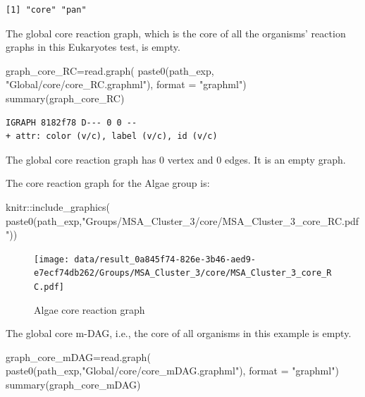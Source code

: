 \documentclass[
  letterpaper,
  DIV=11,
  numbers=noendperiod]{scrreprt}
\newenvironment{Shaded}{}{}
\newcommand{\AttributeTok}[1]{\textcolor[rgb]{0.78,0.47,0.87}{#1}}
\newcommand{\FunctionTok}[1]{\textcolor[rgb]{0.38,0.69,0.94}{#1}}
\newcommand{\NormalTok}[1]{\textcolor[rgb]{0.67,0.70,0.75}{#1}}
\newcommand{\OtherTok}[1]{\textcolor[rgb]{0.15,0.68,0.38}{#1}}
\newcommand{\SpecialCharTok}[1]{\textcolor[rgb]{0.34,0.71,0.76}{#1}}
\newcommand{\StringTok}[1]{\textcolor[rgb]{0.60,0.76,0.47}{#1}}
\begin{document}
\begin{verbatim}
[1] "core" "pan" 
\end{verbatim}

The global core reaction graph, which is the core of all the organisms'
reaction graphs in this Eukaryotes test, is empty.

\begin{Shaded}
\begin{Highlighting}[]
\NormalTok{graph\_core\_RC}\OtherTok{=}\FunctionTok{read.graph}\NormalTok{(}
  \FunctionTok{paste0}\NormalTok{(path\_exp,}
         \StringTok{"Global/core/core\_RC.graphml"}\NormalTok{),}
  \AttributeTok{format =} \StringTok{"graphml"}\NormalTok{)}
\FunctionTok{summary}\NormalTok{(graph\_core\_RC)}
\end{Highlighting}
\end{Shaded}

\begin{verbatim}
IGRAPH 8182f78 D--- 0 0 -- 
+ attr: color (v/c), label (v/c), id (v/c)
\end{verbatim}

The global core reaction graph has 0 vertex and 0 edges. It is an empty
graph.

The core reaction graph for the Algae group is:

\begin{Shaded}
\begin{Highlighting}[]
\NormalTok{knitr}\SpecialCharTok{::}\FunctionTok{include\_graphics}\NormalTok{(}
  \FunctionTok{paste0}\NormalTok{(path\_exp,}\StringTok{"Groups/MSA\_Cluster\_3/core/MSA\_Cluster\_3\_core\_RC.pdf"}\NormalTok{))}
\end{Highlighting}
\end{Shaded}

\begin{figure}[H]

{\centering \texttt{[image: data/result\_0a845f74-826e-3b46-aed9-e7ecf74db262/Groups/MSA\_Cluster\_3/core/MSA\_Cluster\_3\_core\_RC.pdf]}

}

\caption{Algae core reaction graph}

\end{figure}

The global core m-DAG, i.e., the core of all organisms in this example
is empty.

\begin{Shaded}
\begin{Highlighting}[]
\NormalTok{graph\_core\_mDAG}\OtherTok{=}\FunctionTok{read.graph}\NormalTok{(}
  \FunctionTok{paste0}\NormalTok{(path\_exp,}\StringTok{"Global/core/core\_mDAG.graphml"}\NormalTok{),}
  \AttributeTok{format =} \StringTok{"graphml"}\NormalTok{)}
\FunctionTok{summary}\NormalTok{(graph\_core\_mDAG)}
\end{Highlighting}
\end{Shaded}
\end{document}
